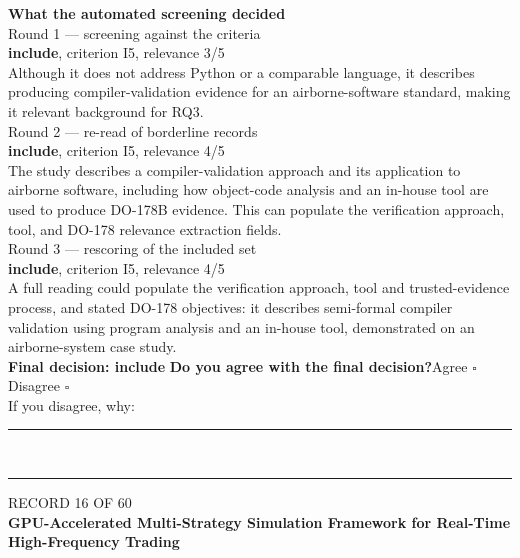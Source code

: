 \documentclass[11pt,a4paper]{article}
\begin{document}
\vspace{3mm}
\vspace{2.5mm}
{\small\textbf{What the automated screening decided}}\\[2mm]
{\footnotesize\color{soft}Round 1 --- screening against the criteria}\\[0.5mm]
{\small\textbf{include}, criterion I5, relevance 3/5}\\[0.5mm]
{\small Although it does not address Python or a comparable language, it describes producing compiler-validation evidence for an airborne-software standard, making it relevant background for RQ3.}\\[2.5mm]
{\footnotesize\color{soft}Round 2 --- re-read of borderline records}\\[0.5mm]
{\small\textbf{include}, criterion I5, relevance 4/5}\\[0.5mm]
{\small The study describes a compiler-validation approach and its application to airborne software, including how object-code analysis and an in-house tool are used to produce DO-178B evidence. This can populate the verification approach, tool, and DO-178 relevance extraction fields.}\\[2.5mm]
{\footnotesize\color{soft}Round 3 --- rescoring of the included set}\\[0.5mm]
{\small\textbf{include}, criterion I5, relevance 4/5}\\[0.5mm]
{\small A full reading could populate the verification approach, tool and trusted-evidence process, and stated DO-178 objectives: it describes semi-formal compiler validation using program analysis and an in-house tool, demonstrated on an airborne-system case study.}\\[2.5mm]
{\small\textbf{Final decision: include}}
\vspace{2mm}
{\small\textbf{Do you agree with the final decision?}\quad{}Agree $\square$\qquad{}Disagree $\square$}\\[1mm]
{\footnotesize\color{soft}If you disagree, why:}\\[1mm]
\color{rule}\rule{\linewidth}{0.3pt}\\[3mm]\rule{\linewidth}{0.3pt}\color{black}
\clearpage
{\color{soft}\footnotesize RECORD 16 OF 60}\\[1mm]
{\large\bfseries GPU-Accelerated Multi-Strategy Simulation Framework for Real-Time High-Frequency Trading}\\[1.5mm]
\end{document}

